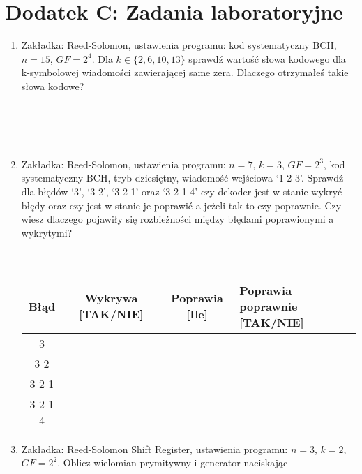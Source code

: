 \setcounter{secnumdepth}{0}
\section*{Dodatek C: Zadania laboratoryjne}

\begin{enumerate}
    \item Zakładka: Reed-Solomon, ustawienia programu: kod systematyczny BCH, $n=15$, $GF=2^4$.
    Dla $k \in \{ 2, 6, 10, 13 \}$ sprawdź wartość słowa kodowego dla k-symbolowej wiadomości zawierającej same zera. Dlaczego otrzymałeś takie słowa kodowe?\\ \\ \\ \\ \\
    \item Zakładka: Reed-Solomon, ustawienia programu: $n = 7$, $k = 3$, $GF = 2^3$,
    kod systematyczny BCH, tryb dziesiętny, wiadomość wejściowa `1 2 3'.
    Sprawdź dla błędów `3', `3 2', `3 2 1' oraz `3 2 1 4' czy dekoder jest w stanie
    wykryć błędy oraz czy jest w stanie je poprawić a jeżeli tak to czy poprawnie.
    Czy wiesz dlaczego pojawiły się rozbieżności między błędami poprawionymi a wykrytymi? \\ \\ \\
    \begin{table}[h]
        \renewcommand{\arraystretch}{1.8}
        \centering
        \begin{tabular}{|c|c|c|>{\centering\arraybackslash}p{5cm}|}
            \hline
            \textbf{Błąd} & \textbf{Wykrywa [TAK/NIE]} & \textbf{Poprawia [Ile]} & \textbf{Poprawia poprawnie [TAK/NIE]} \\
            \hline
            3 & & & \\
            \hline
            3 2 & & & \\
            \hline
            3 2 1 & & & \\
            \hline
            3 2 1 4 & & & \\
            \hline
        \end{tabular}\label{tab:rs2}
    \end{table}
    \item Zakładka: Reed-Solomon Shift Register, ustawienia programu:
    $n = 3$, $k = 2$, $GF = 2^2$. Oblicz wielomian prymitywny i generator naciskając

\end{enumerate}
